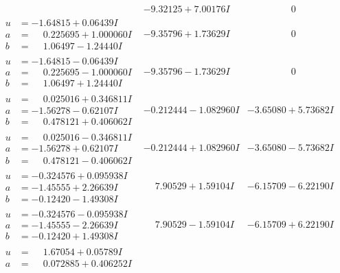 \documentclass[1p]{elsarticle_modified}
\theoremstyle{definition}
\begin{document}
$$\begin{array}{c|c|c}
 & -9.32125 + 7.00176 I & \phantom{-0.000000 } 0 \\ \hline\begin{aligned}
u &= -1.64815 + 0.06439 I \\
a &= \phantom{-}0.225695 + 1.000060 I \\
b &= \phantom{-}1.06497 - 1.24440 I\end{aligned}
 & -9.35796 + 1.73629 I & \phantom{-0.000000 } 0 \\ \hline\begin{aligned}
u &= -1.64815 - 0.06439 I \\
a &= \phantom{-}0.225695 - 1.000060 I \\
b &= \phantom{-}1.06497 + 1.24440 I\end{aligned}
 & -9.35796 - 1.73629 I & \phantom{-0.000000 } 0 \\ \hline\begin{aligned}
u &= \phantom{-}0.025016 + 0.346811 I \\
a &= -1.56278 - 0.62107 I \\
b &= \phantom{-}0.478121 + 0.406062 I\end{aligned}
 & -0.212444 - 1.082960 I & -3.65080 + 5.73682 I \\ \hline\begin{aligned}
u &= \phantom{-}0.025016 - 0.346811 I \\
a &= -1.56278 + 0.62107 I \\
b &= \phantom{-}0.478121 - 0.406062 I\end{aligned}
 & -0.212444 + 1.082960 I & -3.65080 - 5.73682 I \\ \hline\begin{aligned}
u &= -0.324576 + 0.095938 I \\
a &= -1.45555 + 2.26639 I \\
b &= -0.12420 - 1.49308 I\end{aligned}
 & \phantom{-}7.90529 + 1.59104 I & -6.15709 - 6.22190 I \\ \hline\begin{aligned}
u &= -0.324576 - 0.095938 I \\
a &= -1.45555 - 2.26639 I \\
b &= -0.12420 + 1.49308 I\end{aligned}
 & \phantom{-}7.90529 - 1.59104 I & -6.15709 + 6.22190 I \\ \hline\begin{aligned}
u &= \phantom{-}1.67054 + 0.05789 I \\
a &= \phantom{-}0.072885 + 0.406252 I \\

\end{aligned}
\end{array}$$
\end{document}
